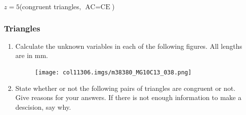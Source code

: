 \begin{table}[H]
{\begin{mdframed}[linewidth=4, leftmargin=40, rightmargin=40]
\begin{exercise}
\begin{enumerate}[noitemsep, label=\textbf{Step}
\textbf{\arabic*}. ]
\label{m38380*id1166228117285}\begin{math}z=5\end{math}\hspace{1ex}(congruent
triangles, 
\begin{math}\text{AC}=\text{CE}\end{math})\par \end{enumerate}
        


    \end{exercise}
    \end{mdframed}
    }
    \noindent
\pagebreak
  \label{m38380*secfhsst!!!underscore!!!id824}
        \subsubsection{  Triangles }
        \nopagebreak
        
          \label{m38380*id318528}\begin{enumerate}[noitemsep,
label=\textbf{\arabic*}. ] 
            \label{m38380*uid50}\item Calculate the unknown variables in each of
the following figures. All
lengths are in mm.

    \setcounter{subfigure}{0}


	\begin{figure}[H] %
    \begin{center}
   
\label{m38380*id318548!!!underscore!!!media}\label{
m38380*id318548!!!underscore!!!printimage}\texttt{[image: 
col11306.imgs/m38380\_MG10C13\_038.png]} %
        
    
    \end{center}

 \end{figure}   

    \addtocounter{footnote}{-0}
            \label{m38380*uid51}\item State whether or not the following pairs
of triangles are congruent or not.
Give reasons for your answers. If there is not enough information to make a
descision, say why.

    \setcounter{subfigure}{0}


	\begin{figure}[H] %
    \begin{center}
   

\end{center}
\end{figure}
\end{enumerate}
\end{table}
